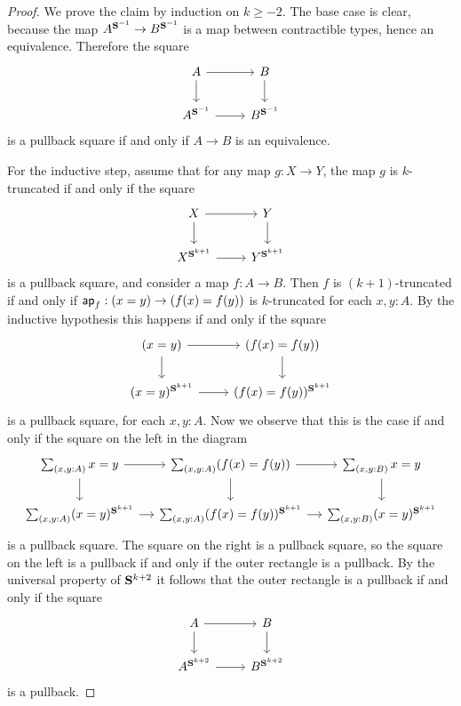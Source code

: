 \begin{proof}
  We prove the claim by induction on $k\geq-2$. The base case is clear, because the map $A^{\mathbf{S}^{-1}}\to B^{\mathbf{S}^{-1}}$ is a map between contractible types, hence an equivalence. Therefore the square
  \begin{equation*}
    \begin{tikzcd}
        A \arrow[r] \arrow[d] & B \arrow[d] \\
        A^{\sphere{-1}} \arrow[r] & B^{\sphere{-1}}
    \end{tikzcd}
  \end{equation*}
  is a pullback square if and only if $A\to B$ is an equivalence.

  For the inductive step, assume that for any map $g:X\to Y$, the map $g$ is $k$-truncated if and only if the square
  \begin{equation*}
    \begin{tikzcd}
      X \arrow[r] \arrow[d] & Y \arrow[d] \\
      X^{\sphere{k+1}} \arrow[r] & Y^{\sphere{k+1}}
    \end{tikzcd}
  \end{equation*}
  is a pullback square, and consider a map $f:A\to B$. Then $f$ is $(k+1)$-truncated if and only if $\mathsf{ap}_{f}:(x=y)\to(f(x)=f(y))$ is $k$-truncated for each $x,y:A$. By the inductive hypothesis this happens if and only if the square
  \begin{equation*}
    \begin{tikzcd}
      (x=y) \arrow[r] \arrow[d] & (f(x)=f(y)) \arrow[d] \\
      (x=y)^{\sphere{k+1}} \arrow[r] & (f(x)=f(y))^{\sphere{k+1}}
    \end{tikzcd}
  \end{equation*}
  is a pullback square, for each $x,y:A$. Now we observe that this is the case if and only if the square on the left in the diagram
  \begin{equation*}
    \begin{tikzcd}[column sep=small]
      \sm{x,y:A}x=y \arrow[r] \arrow[d] & \sm{x,y:A}(f(x)=f(y)) \arrow[d] \arrow[r] & \sm{x,y:B}x=y \arrow[d] \\
      \sm{x,y:A}(x=y)^{\sphere{k+1}} \arrow[r] & \sm{x,y:A}(f(x)=f(y))^{\sphere{k+1}} \arrow[r] & \sm{x,y:B}(x=y)^{\sphere{k+1}}
    \end{tikzcd}
  \end{equation*}
  is a pullback square. The square on the right is a pullback square, so the square on the left is a pullback if and only if the outer rectangle is a pullback. By the universal property of $\mathbf{S}^{k+2}$ it follows that the outer rectangle is a pullback if and only if the square
  \begin{equation*}
    \begin{tikzcd}
      A \arrow[r] \arrow[d] & B \arrow[d] \\
      A^{\sphere{k+2}} \arrow[r] & B^{\sphere{k+2}}
    \end{tikzcd}
  \end{equation*}
  is a pullback.
\end{proof}

